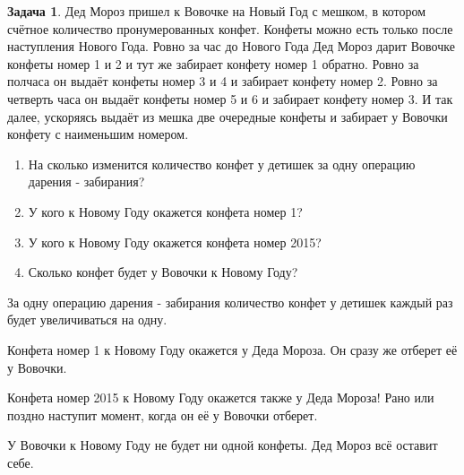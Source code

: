 \documentclass[pdftex, 12pt, a4paper]{article}
\theoremstyle{definition} %
\newtheorem{problem}{Задача}
\numberwithin{problem}{section}
\numberwithin{blits}{section}
\begin{document}
\begin{problem}
Дед Мороз пришел к Вовочке на Новый Год с мешком, в котором счётное количество пронумерованных конфет. Конфеты можно есть только после наступления Нового Года. Ровно за час до Нового Года Дед Мороз дарит Вовочке конфеты номер 1 и 2 и тут же забирает конфету номер 1 обратно. Ровно за полчаса он выдаёт конфеты номер 3 и 4 и забирает конфету номер 2. Ровно за четверть часа он выдаёт конфеты номер 5 и 6 и забирает конфету номер 3. И так далее, ускоряясь выдаёт из мешка две очередные конфеты и забирает у Вовочки конфету с наименьшим номером.


\begin{enumerate}
\item На сколько изменится количество конфет у детишек за одну операцию дарения - забирания?
\item У кого к Новому Году окажется конфета номер 1?
\item У кого к Новому Году окажется конфета номер 2015?
\item Сколько конфет будет у Вовочки к Новому Году?
\end{enumerate}
\begin{sol}
За одну операцию дарения - забирания количество конфет у детишек каждый раз будет увеличиваться на одну.

Конфета номер 1 к Новому Году окажется у Деда Мороза. Он сразу же отберет её у Вовочки.

Конфета номер 2015 к Новому Году окажется также у Деда Мороза! Рано или поздно наступит момент, когда он её у Вовочки отберет.

У Вовочки к Новому Году не будет ни одной конфеты. Дед Мороз всё оставит себе.
\end{sol}
\end{problem}
\end{document}
